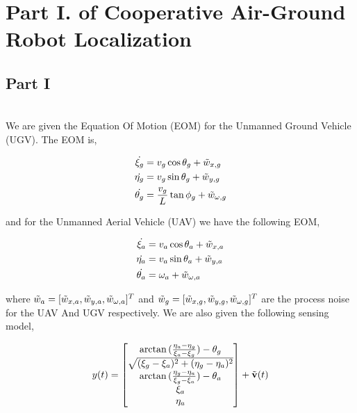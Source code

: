 \documentclass[paper=a4, fontsize=11pt]{scrartcl} %
\numberwithin{equation}{section} %
\numberwithin{figure}{section} %
\numberwithin{table}{section} %
\begin{document}
\section{Part I. of Cooperative Air-Ground Robot Localization}
\begin{framed}
\subsection{Part I} \\

We are given the Equation Of Motion (EOM) for the Unmanned Ground Vehicle (UGV).  The EOM is,

\begin{align*}
    \dot{\xi_g} &= v_g \cos{\theta_g} + \Tilde{w}_{x,g} \\
    \dot{\eta_g} &= v_g \sin{\theta_g} + \Tilde{w}_{y,g} \\
    \dot{\theta_g} &= \frac{v_g}{L}\tan{\phi_g}  + \Tilde{w}_{\omega,g} \\
\end{align*}

and for the Unmanned Aerial Vehicle (UAV) we have the following EOM,

\begin{align*}
    \dot{\xi_a} &= v_a \cos{\theta_a} + \Tilde{w}_{x,a} \\
    \dot{\eta_a} &= v_a \sin{\theta_a} + \Tilde{w}_{y,a} \\
    \dot{\theta_a} &= \omega_a  + \Tilde{w}_{\omega,a} \\
\end{align*}

where $\Tilde{w}_a = [ \Tilde{w}_{x,a},  \Tilde{w}_{y,a},  \Tilde{w}_{\omega,a}]^T$ and $\Tilde{w}_g = [ \Tilde{w}_{x,g},  \Tilde{w}_{y,g},  \Tilde{w}_{\omega,g}]^T$ are the process noise for the UAV And UGV respectively.  We are also given the following sensing model,

\begin{align*}
y(t) &=  
\begin{bmatrix} \arctan{(\frac{\eta_a - \eta_g}{\xi_a - \xi_g}}) - \theta_g   \\ 
                \sqrt{  (\xi_g - \xi_a)^2 + (\eta_g - \eta_a)^2}  \\
                \arctan{(\frac{\eta_g - \eta_a}{\xi_g - \xi_a})} - \theta_a \\
                \xi_a \\
                \eta_a
\end{bmatrix}  + \Tilde{\bold{v}}(t) \\
\end{align*}


\end{framed}
\end{document}

